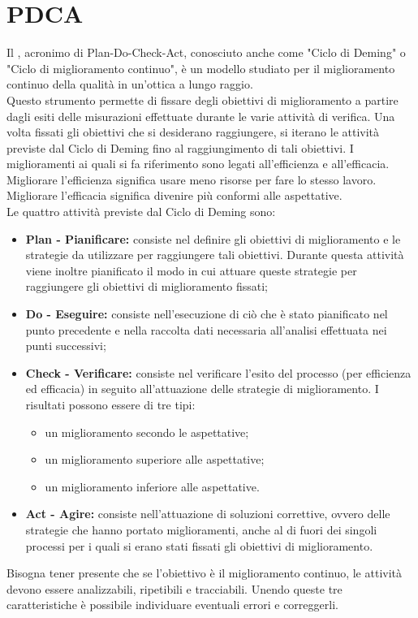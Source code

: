 \documentclass[PianoDiQualifica.tex]{subfiles}
\begin{document}
\section{PDCA}
Il , acronimo di Plan-Do-Check-Act, conosciuto anche come "Ciclo di
Deming" o "Ciclo di miglioramento continuo", è un modello studiato per il
miglioramento continuo della qualità in un’ottica a lungo raggio.\\ 
Questo strumento permette di fissare degli obiettivi di miglioramento a partire dagli esiti delle misurazioni effettuate durante le varie attività di verifica.
Una volta fissati gli obiettivi che si desiderano raggiungere, si iterano le attività previste dal Ciclo di Deming fino al raggiungimento di tali obiettivi.
I miglioramenti ai quali si fa riferimento sono legati all’efficienza e all’efficacia. Migliorare l’efficienza significa usare meno risorse per fare lo stesso
lavoro. Migliorare l’efficacia significa divenire più conformi alle aspettative.\\
Le quattro attività previste dal Ciclo di Deming sono:
\begin{itemize}
\item \textbf{Plan - Pianificare:} consiste nel definire gli obiettivi di miglioramento
e le strategie da utilizzare per raggiungere tali obiettivi. Durante questa
attività viene inoltre pianificato il modo in cui attuare queste strategie
per raggiungere gli obiettivi di miglioramento fissati;
\item \textbf{Do - Eseguire:} consiste nell'esecuzione di ciò che è stato pianificato nel punto precedente e nella raccolta dati necessaria all'analisi effettuata nei punti successivi;
\item \textbf{ Check - Verificare:} consiste nel verificare l’esito del processo (per
efficienza ed efficacia) in seguito all’attuazione delle strategie di miglioramento. I risultati possono essere di tre tipi:
\begin{itemize}
\item un miglioramento secondo le aspettative;
\item un miglioramento superiore alle aspettative;
\item un miglioramento inferiore alle aspettative.
\end{itemize}
\item \textbf{ Act - Agire:} consiste nell’attuazione di soluzioni correttive, ovvero delle strategie che hanno portato miglioramenti, anche al di fuori dei singoli processi per i quali si erano stati fissati gli obiettivi di miglioramento.
\end{itemize}

Bisogna tener presente che se l’obiettivo è il miglioramento continuo, le attività devono essere analizzabili, ripetibili e tracciabili. Unendo queste tre
caratteristiche è possibile individuare eventuali errori e correggerli.
\end{document}
